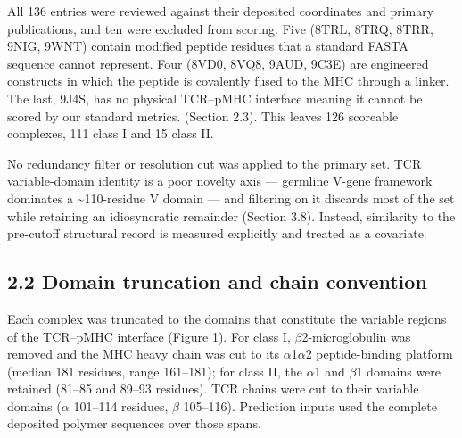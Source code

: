 \documentclass[
  11pt,
]{article}
\begin{document}
All 136 entries were reviewed against their deposited coordinates and
primary publications, and ten were excluded from scoring. Five (8TRL,
8TRQ, 8TRR, 9NIG, 9WNT) contain modified peptide residues that a
standard FASTA sequence cannot represent. Four (8VD0, 8VQ8,
9AUD, 9C3E) are engineered constructs in which the peptide is covalently
fused to the MHC through a linker. The
last, 9J4S, has no physical TCR--pMHC interface meaning it cannot be scored by our standard metrics.
(Section 2.3). This leaves 126 scoreable complexes, 111 class I and 15 class II.

No redundancy filter or resolution cut was applied to the primary set.
TCR variable-domain identity is a poor novelty axis --- germline V-gene
framework dominates a \textasciitilde110-residue V domain --- and
filtering on it discards most of the set while retaining an
idiosyncratic remainder (Section 3.8). Instead, similarity to the
pre-cutoff structural record is measured explicitly and treated as a
covariate.

\subsection{2.2 Domain truncation and chain
convention}\label{domain-truncation-and-chain-convention}

Each complex was truncated to the domains that constitute the variable regions of the TCR--pMHC 
interface (Figure 1). For class I, \ensuremath{\beta}2-microglobulin was removed and the
MHC heavy chain was cut to its \ensuremath{\alpha}1\ensuremath{\alpha}2 peptide-binding platform (median 181
residues, range 161--181); for class II, the \ensuremath{\alpha}1 and \ensuremath{\beta}1 domains were
retained (81--85 and 89--93 residues). TCR chains were cut to their
variable domains (\ensuremath{\alpha} 101--114 residues, \ensuremath{\beta} 105--116). Prediction inputs
used the complete deposited polymer sequences over those spans.
\end{document}
